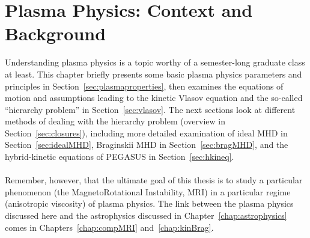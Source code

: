 \chapter{Plasma Physics: Context and Background}
Understanding plasma physics is a topic worthy of a semester-long graduate class at least. This chapter briefly presents some basic plasma physics parameters and principles in Section~\ref{sec:plasmaproperties}, then examines the equations of motion and assumptions leading to the kinetic Vlasov equation and the so-called ``hierarchy problem'' in Section~\ref{sec:vlasov}. The next sections look at different methods of dealing with the hierarchy problem (overview in Section~\ref{sec:closures}), including more detailed examination of ideal MHD in Section~\ref{sec:idealMHD}, Braginskii MHD in Section~\ref{sec:bragMHD}, and the hybrid-kinetic equations of PEGASUS in Section~\ref{sec:hkineq}. \\
\\
Remember, however, that the ultimate goal of this thesis is to study a particular phenomenon (the MagnetoRotational Instability, MRI) in a particular regime (anisotropic viscosity) of plasma physics. The link between the plasma physics discussed here and the astrophysics discussed in Chapter~\ref{chap:astrophysics} comes in Chapters~\ref{chap:compMRI} and~\ref{chap:kinBrag}.



